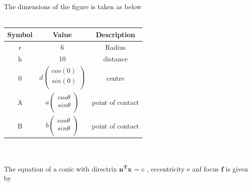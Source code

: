 \documentclass[journal,10pt,twocolumn]{article}
\let\vec\mathbf
\begin{document}
The dimensions of the figure is taken as below\\\\
{
\setlength\extrarowheight{2pt}
\centering
\begin{tabular}{|c|c|c|}
 \hline
 \textbf{Symbol}&\textbf{Value}&\textbf{Description}\\
 \hline
 r&6&Radius\\
 \hline
 h&10&distance\\
 \hline
 0&$d%
 \begin{pmatrix}
  cos(0)\\
  sin(0)\\
 \end{pmatrix}$%
 &centre\\
 \hline
 A&$a%
 \begin{pmatrix}
  cos\theta\\
  sin\theta\\
 \end{pmatrix}$%
 &point of contact\\
 \hline
 B&$b%
 \begin{pmatrix}
  cos\theta\\
  sin\theta\\
 \end{pmatrix}$%
 &point of contact\\
 \hline
\end{tabular}
}	
\\\\
	The equation of a conic with directrix $\vec{n^Tx}$ = c , eccentricity e anf focus $\boldsymbol{f}$ is given by
	
\end{document}
